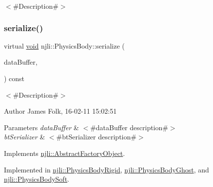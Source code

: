$<$\#\+Description\#$>$ \mbox{\label{classnjli_1_1_physics_body_a3c40378e7f3033557ec6adf9428b6a9d}} 
\subsubsection{\texorpdfstring{serialize()}{serialize()}}
{\footnotesize\ttfamily virtual \mbox{\hyperlink{_thread_8h_af1e856da2e658414cb2456cb6f7ebc66}{void}} njli\+::\+Physics\+Body\+::serialize (\begin{DoxyParamCaption}\item[{\mbox{\hyperlink{_thread_8h_af1e856da2e658414cb2456cb6f7ebc66}{void}} $\ast$}]{data\+Buffer,  }\item[{bt\+Serializer $\ast$}]{ }\end{DoxyParamCaption}) const\hspace{0.3cm}{\ttfamily [pure virtual]}}



$<$\#\+Description\#$>$ 

\begin{DoxyAuthor}{Author}
James Folk, 16-\/02-\/11 15\+:02\+:51
\end{DoxyAuthor}

\begin{DoxyParams}{Parameters}
{\em data\+Buffer} & $<$\#data\+Buffer description\#$>$ \\
\hline
{\em bt\+Serializer} & $<$\#bt\+Serializer description\#$>$ \\
\hline
\end{DoxyParams}


Implements \mbox{\hyperlink{classnjli_1_1_abstract_factory_object_aad2fbe86fb3bdecf02918a96b9c57976}{njli\+::\+Abstract\+Factory\+Object}}.



Implemented in \mbox{\hyperlink{classnjli_1_1_physics_body_rigid_aa2f009ffadaf78b84bd36c8cb5536f6c}{njli\+::\+Physics\+Body\+Rigid}}, \mbox{\hyperlink{classnjli_1_1_physics_body_ghost_ad3f75b8cbff7431afbb14569bda203c4}{njli\+::\+Physics\+Body\+Ghost}}, and \mbox{\hyperlink{classnjli_1_1_physics_body_soft_a7e38c5df16551787c35fc55c1335ddf1}{njli\+::\+Physics\+Body\+Soft}}.

\mbox{\label{classnjli_1_1_physics_body_a4fc4bcd9d1930911474210c047372fc0}} 
